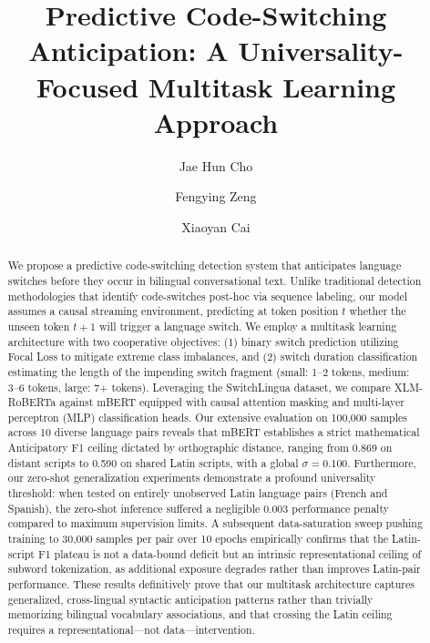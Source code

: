 \documentclass[sigconf,nonacm]{acmart}
\begin{document}
\title{Predictive Code-Switching Anticipation: A Universality-Focused Multitask Learning Approach}

\author{Jae Hun Cho}

\author{Fengying Zeng}

\author{Xiaoyan Cai}

\begin{abstract}
We propose a predictive code-switching detection system that anticipates language switches before they occur in bilingual conversational text. Unlike traditional detection methodologies that identify code-switches post-hoc via sequence labeling, our model assumes a causal streaming environment, predicting at token position \(t\) whether the unseen token \(t+1\) will trigger a language switch. We employ a multitask learning architecture with two cooperative objectives: (1) binary switch prediction utilizing Focal Loss to mitigate extreme class imbalances, and (2) switch duration classification estimating the length of the impending switch fragment (small: 1--2 tokens, medium: 3--6 tokens, large: 7+ tokens). Leveraging the SwitchLingua dataset, we compare XLM-RoBERTa against mBERT equipped with causal attention masking and multi-layer perceptron (MLP) classification heads. Our extensive evaluation on 100,000 samples across 10 diverse language pairs reveals that mBERT establishes a strict mathematical Anticipatory F1 ceiling dictated by orthographic distance, ranging from 0.869 on distant scripts to 0.590 on shared Latin scripts, with a global \(\sigma = 0.100\). Furthermore, our zero-shot generalization experiments demonstrate a profound universality threshold: when tested on entirely unobserved Latin language pairs (French and Spanish), the zero-shot inference suffered a negligible 0.003 performance penalty compared to maximum supervision limits. A subsequent data-saturation sweep pushing training to 30,000 samples per pair over 10 epochs empirically confirms that the Latin-script F1 plateau is not a data-bound deficit but an intrinsic representational ceiling of subword tokenization, as additional exposure degrades rather than improves Latin-pair performance. These results definitively prove that our multitask architecture captures generalized, cross-lingual syntactic anticipation patterns rather than trivially memorizing bilingual vocabulary associations, and that crossing the Latin ceiling requires a representational---not data---intervention.
\end{abstract}
\end{document}
